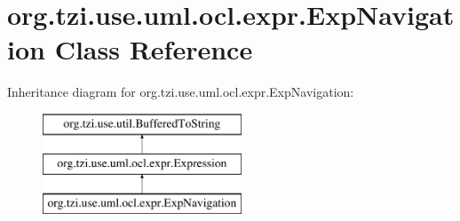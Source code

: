 \hypertarget{classorg_1_1tzi_1_1use_1_1uml_1_1ocl_1_1expr_1_1_exp_navigation}{\section{org.\-tzi.\-use.\-uml.\-ocl.\-expr.\-Exp\-Navigation Class Reference}
\label{classorg_1_1tzi_1_1use_1_1uml_1_1ocl_1_1expr_1_1_exp_navigation}
}
Inheritance diagram for org.\-tzi.\-use.\-uml.\-ocl.\-expr.\-Exp\-Navigation\-:\begin{figure}[H]
\begin{center}
\leavevmode
\includegraphics[height=3.000000cm]{classorg_1_1tzi_1_1use_1_1uml_1_1ocl_1_1expr_1_1_exp_navigation}
\end{center}
\end{figure}
